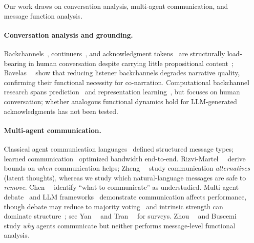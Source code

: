 Our work draws on conversation analysis, multi-agent communication, and message function analysis.

\paragraph{Conversation analysis and grounding.}
Backchannels~\cite{yngve_getting_1970}, continuers~\cite{schegloff_discourse_1982}, and acknowledgment tokens~\cite{jefferson_acknowledgment_1984} are structurally load-bearing in human conversation despite carrying little propositional content~\cite{clark_contributing_1989}; Bavelas~\etal~\cite{bavelas_co_narrators_2000} show that reducing listener backchannels degrades narrative quality, confirming their functional necessity for co-narration. Computational backchannel research spans prediction~\cite{liermann_backchannel_2023, inoue_backchannel_2025} and representation learning~\cite{qian_backchannel_2026}, but focuses on human conversation; whether analogous functional dynamics hold for LLM-generated acknowledgments has not been tested.

\paragraph{Multi-agent communication.}
Classical agent communication languages~\cite{finin_kqml_1994} defined structured message types; learned communication~\cite{sukhbaatar_commnet_2016, foerster_dial_2016, wang_imac_2020} optimized bandwidth end-to-end. Rizvi-Martel~\etal~\cite{rizvi_martel_communication_2026} derive bounds on \emph{when} communication helps; Zheng~\etal~\cite{zheng_thought_comm_2025} study communication \emph{alternatives} (latent thoughts), whereas we study which natural-language messages are safe to \emph{remove}. Chen~\etal~\cite{chen_five_ws_2026} identify ``what to communicate'' as understudied. Multi-agent debate~\cite{du_debate_2024} and LLM frameworks~\cite{li_camel_2023, hong_metagpt_2024, wu_autogen_2024, chen_agentverse_2024, wang_megaagent_2025} demonstrate communication affects performance, though debate may reduce to majority voting~\cite{choi_debate_vote_2025} and intrinsic strength can dominate structure~\cite{wu_can_llm_debate_2025, deliberationbench_2026, la_malfa_miss_mark_2025}; see Yan~\etal~\cite{yan_beyond_self_talk_2025} and Tran~\etal~\cite{tran_collaboration_survey_2025} for surveys. Zhou~\etal~\cite{zhou_why_agents_communicate_2025} and Buscemi~\etal~\cite{buscemi_strategic_comm_2025} study \emph{why} agents communicate but neither performs message-level functional analysis.

